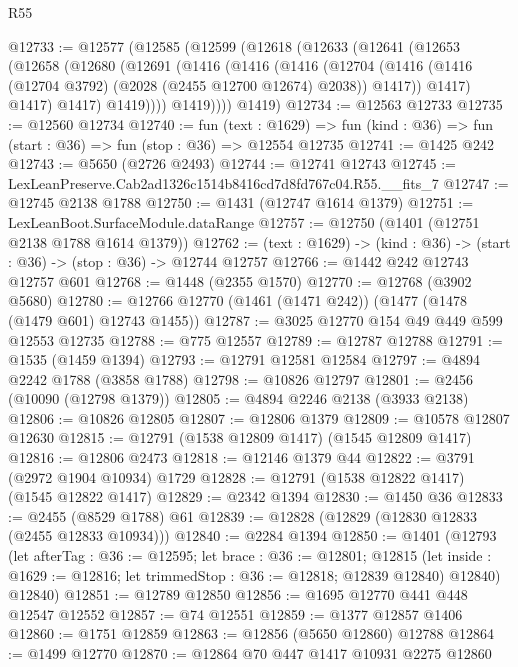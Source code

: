 \begin{lexlean}{R55}
\begin{coremodule}
{{@12733 := @12577
    (@12585
      (@12599
        (@12618
          (@12633
            (@12641
              (@12653
                (@12658
                  (@12680
                    (@12691
                      (@1416
                        (@1416
                          (@1416
                            (@12704
                              (@1416
                                (@1416 (@12704 @3792) (@2028 (@2455 @12700 @12674) @2038))
                                @1417))
                            @1417)
                          @1417)
                        @1417)
                      @1419))))
              @1419))))
      @1419)
@12734 := @12563 @12733
@12735 := @12560 @12734
@12740 := fun (text : @1629) =>
  fun (kind : @36) => fun (start : @36) => fun (stop : @36) => @12554 @12735
@12741 := @1425 @242
@12743 := @5650 (@2726 @2493)
@12744 := @12741 @12743
@12745 := LexLeanPreserve.Cab2ad1326c1514b8416cd7d8fd767c04.R55.__fits_7
@12747 := @12745 @2138 @1788
@12750 := @1431 (@12747 @1614 @1379)
@12751 := LexLeanBoot.SurfaceModule.dataRange
@12757 := @12750 (@1401 (@12751 @2138 @1788 @1614 @1379))
@12762 := (text : @1629) -> (kind : @36) -> (start : @36) -> (stop : @36) -> @12744 @12757
@12766 := @1442 @242 @12743 @12757 @601
@12768 := @1448 (@2355 @1570)
@12770 := @12768 (@3902 @5680)
@12780 := @12766 @12770 (@1461 (@1471 @242)) (@1477 (@1478 (@1479 @601) @12743 @1455))
@12787 := @3025 @12770 @154 @49 @449 @599 @12553 @12735
@12788 := @775 @12557
@12789 := @12787 @12788
@12791 := @1535 (@1459 @1394)
@12793 := @12791 @12581 @12584
@12797 := @4894 @2242 @1788 (@3858 @1788)
@12798 := @10826 @12797
@12801 := @2456 (@10090 (@12798 @1379))
@12805 := @4894 @2246 @2138 (@3933 @2138)
@12806 := @10826 @12805
@12807 := @12806 @1379
@12809 := @10578 @12807 @12630
@12815 := @12791 (@1538 @12809 @1417) (@1545 @12809 @1417)
@12816 := @12806 @2473
@12818 := @12146 @1379 @44
@12822 := @3791 (@2972 @1904 @10934) @1729
@12828 := @12791 (@1538 @12822 @1417) (@1545 @12822 @1417)
@12829 := @2342 @1394
@12830 := @1450 @36
@12833 := @2455 (@8529 @1788) @61
@12839 := @12828 (@12829 (@12830 @12833 (@2455 @12833 @10934)))
@12840 := @2284 @1394
@12850 := @1401
    (@12793
      (let afterTag : @36 := @12595;
      let brace : @36 := @12801;
      @12815 (let inside : @1629 := @12816; let trimmedStop : @36 := @12818; @12839 @12840) @12840)
      @12840)
@12851 := @12789 @12850
@12856 := @1695 @12770 @441 @448 @12547 @12552
@12857 := @74 @12551
@12859 := @1377 @12857 @1406
@12860 := @1751 @12859
@12863 := @12856 (@5650 @12860) @12788
@12864 := @1499 @12770
@12870 := @12864 @70 @447 @1417 @10931 @2275 @12860
}}
\end{coremodule}
\end{lexlean}
